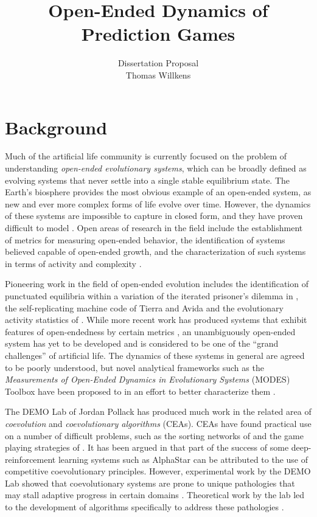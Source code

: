 \documentclass{article}
\title{Open-Ended Dynamics of Prediction Games}
\author{Dissertation Proposal\\
    Thomas Willkens
    }
\date{}
\begin{document}
\maketitle

\section*{Background}
Much of the artificial life community is currently focused on the problem of understanding
\textit{open-ended evolutionary systems}, which can be broadly defined as evolving systems that
never settle into a single stable equilibrium state. The Earth's biosphere provides the most
obvious example of an open-ended system, as new and ever more complex forms of life evolve over 
time. However, the dynamics of these systems are impossible to capture in closed form, and they
have proven difficult to model \citep{thurner2018}.
Open areas of research in the field include the establishment of metrics for measuring open-ended behavior, the 
identification of systems believed capable of open-ended growth, and the characterization of 
such systems in terms of activity and complexity \citep{packard2019,stepney2021modelling}.

Pioneering work in the field of open-ended evolution includes the identification of punctuated 
equilibria within a variation of the
iterated prisoner's dilemma in \citet{lindgren1994evolutionary}, the self-replicating machine 
code of Tierra and Avida \citep{ray1992evolution,ofria2004avida} and the evolutionary activity 
statistics of \citet{Channon2001PassingTA}. While more recent work has produced  
systems that exhibit features of open-endedness
by certain metrics \citep{adams2017formal,soros2014identifying}, an unambiguously open-ended 
system has yet to be developed and is considered 
to be one of the ``grand challenges'' of artificial life. The dynamics of these systems in 
general are agreed to be poorly understood, but novel analytical frameworks such as the 
\textit{Measurements of Open-Ended Dynamics in Evolutionary Systems} (MODES) Toolbox have been
proposed to in an effort to better characterize them \citep{dolson2019modes}.

The DEMO Lab of Jordan Pollack has produced much work in the related area of \textit{coevolution} and 
\textit{coevolutionary algorithms} (CEAs). CEAs have found practical use on a number of 
difficult problems, such as the sorting networks of \citet{hillis1990co} and the game playing strategies of 
\citet{rosin1995methods}. It has been argued in \citet{togelius2019} that part of the success 
of some deep-reinforcement learning systems such as AlphaStar can be attributed to the use of 
competitive coevolutionary principles. However, experimental work by the DEMO Lab showed that 
coevolutionary systems are  prone to unique pathologies that may stall adaptive progress in
certain domains \citep{watson2001coevolutionary}. Theoretical 
work by the lab led to the development of algorithms specifically to address these pathologies
\citep{noble2001pareto, jong2004ideal,de2004incremental}. 
\end{document}
